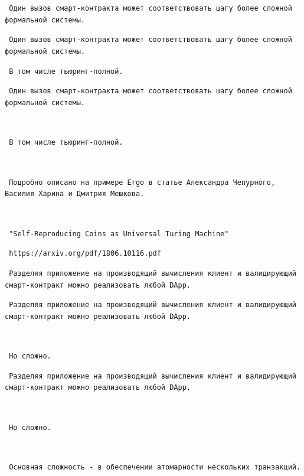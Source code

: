 \documentclass[11pt,handout,pdf,hyperref={unicode}]{beamer}
\begin{document}
\begin{frame}[fragile]

\texttt{ Один вызов смарт-контракта может соответствовать шагу более сложной формальной системы. }

\end{frame}

\begin{frame}[fragile]

\texttt{ Один вызов смарт-контракта может соответствовать шагу более сложной формальной системы. }

\texttt{ В том числе тьюринг-полной. }

\end{frame}

\begin{frame}[fragile]

\texttt{ Один вызов смарт-контракта может соответствовать шагу более сложной формальной системы. }

\texttt{ }

\texttt{ В том числе тьюринг-полной. }

\texttt{ }

\texttt{ Подробно описано на примере Ergo в статье  Александра Чепурного, Василия Харина и Дмитрия Мешкова. }

\texttt{ }

\texttt{ "Self-Reproducing Coins as Universal Turing Machine" }

\texttt{ https://arxiv.org/pdf/1806.10116.pdf }

\end{frame}

\begin{frame}[fragile]

\texttt{ Разделяя приложение на производящий вычисления клиент и валидирующий смарт-контракт можно реализовать любой DApp. }

\end{frame}

\begin{frame}[fragile]

\texttt{ Разделяя приложение на производящий вычисления клиент и валидирующий смарт-контракт можно реализовать любой DApp. }

\texttt{ }

\texttt{ Но сложно. }

\end{frame}

\begin{frame}[fragile]

\texttt{ Разделяя приложение на производящий вычисления клиент и валидирующий смарт-контракт можно реализовать любой DApp. }

\texttt{ }

\texttt{ Но сложно. }

\texttt{ }

\texttt{ Основная сложность - в обеспечении атомарности нескольких транзакций. }

\end{frame}
\end{document}
